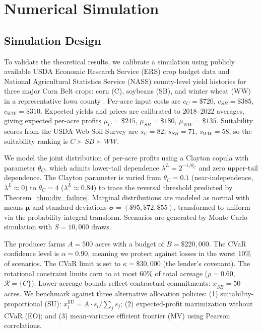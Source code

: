 \documentclass[12pt,review,authoryear]{elsarticle}
\numberwithin{equation}{section}
\begin{document}
\section{Numerical Simulation}
\label{sec:simulation}

\subsection{Simulation Design}

To validate the theoretical results, we calibrate a simulation using
publicly available USDA Economic Research Service (ERS) crop budget data
and National Agricultural Statistics Service (NASS) county-level yield
histories for three major Corn Belt crops: corn (C), soybeans (SB), and
winter wheat (WW) in a representative Iowa county \citep{USDA2023ERS,USDA2023NASS}.
Per-acre input costs are $c_C = \$720$, $c_{SB} = \$385$, $c_{WW} = \$310$.
Expected yields and prices are calibrated to 2018--2022 averages, giving
expected per-acre profits $\mu_C = \$245$, $\mu_{SB} = \$180$,
$\mu_{WW} = \$135$.  Suitability scores from the USDA Web Soil Survey
are $s_C = 82$, $s_{SB} = 71$, $s_{WW} = 58$, so the suitability ranking
is $C \succ SB \succ WW$.

We model the joint distribution of per-acre profits using a Clayton
copula with parameter $\theta_C$, which admits lower-tail dependence
$\lambda^L = 2^{-1/\theta_C}$ and zero upper-tail dependence.  The
Clayton parameter is varied from $\theta_C = 0.1$ (near-independence,
$\lambda^L \approx 0$) to $\theta_C = 4$ ($\lambda^L \approx 0.84$) to
trace the reversal threshold predicted by Theorem~\ref{thm:div_failure}.
Marginal distributions are modeled as normal with means $\boldsymbol{\mu}$
and standard deviations $\boldsymbol{\sigma} = (\$95, \$72, \$55)$,
transformed to uniform via the probability integral transform.  Scenarios
are generated by Monte Carlo simulation with $S = 10{,}000$ draws.

The producer farms $A = 500$ acres with a budget of $B = \$220{,}000$.
The CVaR confidence level is $\alpha = 0.90$, meaning we protect against
losses in the worst 10\% of scenarios.  The CVaR limit is set to
$\kappa = \$30{,}000$ (the lender's covenant).  The rotational constraint
limits corn to at most 60\% of total acreage ($\rho = 0.60$, $\mathcal{R} = \{C\}$).
Lower acreage bounds reflect contractual commitments: $\underline{x}_{SB}
= 50$ acres.  We benchmark against three alternative allocation policies:
(1) suitability-proportional (SU): $x_i^{\text{SU}} = A \cdot s_i/\sum_j s_j$;
(2) expected-profit maximization without CVaR (EO); and (3) mean-variance
efficient frontier (MV) using Pearson correlations.
\end{document}
